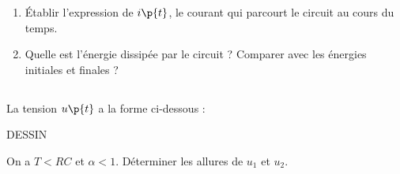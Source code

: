     \begin{enumerate}
        \item Établir l'expression de $i\p{t}$, le courant qui parcourt le circuit au cours du temps.
        
        \boxans{
        
        }
        
        \item Quelle est l'énergie dissipée par le circuit ? Comparer avec les énergies initiales et finales ?
        
        \boxans{
        
        }
    \end{enumerate}
    
    \subsection{}
    
    \subsection{}
    
    La tension $u\p{t}$ a la forme ci-dessous :
    
    DESSIN 
    
    On a $T < RC$ et $\alpha < 1$. Déterminer les allures de $u_1$ et $u_2$.
    
    \boxans{
    
    }
    \subsection{}

    \subsection{}

